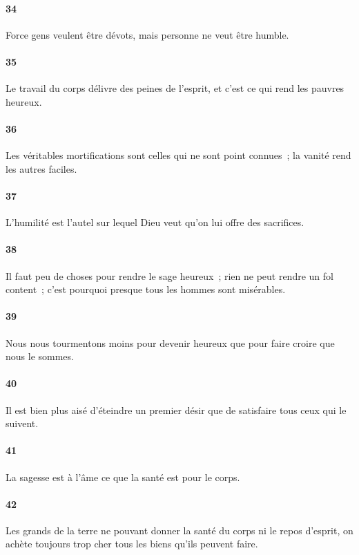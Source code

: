\documentclass[french,twoside]{book} %
\begin{document}
\paragraph[{34}]{ \textsc{34} }
\noindent Force gens veulent être dévots, mais personne ne veut être humble.
\paragraph[{35}]{ \textsc{35} }
\noindent Le travail du corps délivre des peines de l’esprit, et c’est ce qui rend les pauvres heureux.
\paragraph[{36}]{ \textsc{36} }
\noindent Les véritables mortifications sont celles qui ne sont point connues ; la vanité rend les autres faciles.
\paragraph[{37}]{ \textsc{37} }
\noindent L’humilité est l’autel sur lequel Dieu veut qu’on lui offre des sacrifices.
\paragraph[{38}]{ \textsc{38} }
\noindent Il faut peu de choses pour rendre le sage heureux ; rien ne peut rendre un fol content ; c’est pourquoi presque tous les hommes sont misérables.
\paragraph[{39}]{ \textsc{39} }
\noindent Nous nous tourmentons moins pour devenir heureux que pour faire croire que nous le sommes.
\paragraph[{40}]{ \textsc{40} }
\noindent Il est bien plus aisé d’éteindre un premier désir que de satisfaire tous ceux qui le suivent.
\paragraph[{41}]{ \textsc{41} }
\noindent La sagesse est à l’âme ce que la santé est pour le corps.
\paragraph[{42}]{ \textsc{42} }
\noindent Les grands de la terre ne pouvant donner la santé du corps ni le repos d’esprit, on achète toujours trop cher tous les biens qu’ils peuvent faire.
\end{document}
